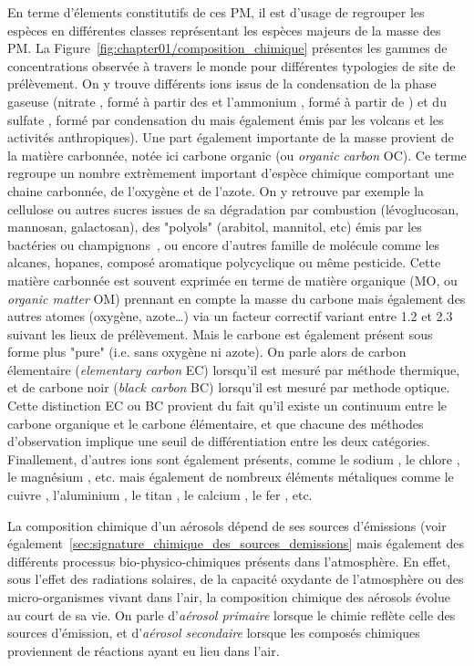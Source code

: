 En terme d'élements constitutifs de ces PM, il est d'usage de regrouper les espèces en
différentes classes représentant les espèces majeurs de la masse des PM. La
Figure~\ref{fig:chapter01/composition_chimique} présentes les gammes de concentrations
observée à travers le monde pour différentes typologies de site de prélèvement.
On y trouve différents ions issus de la condensation de la phase gaseuse (nitrate \NOt, formé à
partir des  et l'ammonium , formé à partir de ) et du sulfate
\SOq, formé par condensation du  mais également émis par les volcans et les
activités anthropiques).
Une part également importante de la masse provient de la matière carbonnée, notée ici
carbone organic (ou \textit{organic carbon} OC). Ce terme regroupe un nombre extrèmement
important d'espèce chimique comportant une chaine carbonnée, de l'oxygène et
de l'azote. On y retrouve par exemple la cellulose ou autres sucres issues de sa
dégradation par combustion (lévoglucosan, mannosan, galactosan), des "polyols" (arabitol,
mannitol, etc) émis par les bactéries ou champignons~\autocite{samakePolyols2019}, ou encore
d'autres famille de molécule comme les alcanes, hopanes, composé aromatique polycyclique
ou même pesticide. Cette matière carbonnée est souvent exprimée en terme de matière
organique (MO, ou \textit{organic matter} OM) prennant en compte la masse du carbone mais
également des autres atomes (oxygène, azote…) via un facteur correctif variant entre 1.2
et 2.3 suivant les lieux de prélèvement.
Mais le carbone est également présent sous forme plus "pure" (i.e. sans oxygène ni azote).
On parle alors de carbon élementaire (\textit{elementary carbon} EC) lorsqu'il est mesuré
par méthode thermique, et de carbone noir (\textit{black carbon} BC) lorsqu'il est mesuré
par methode optique. Cette distinction EC ou BC provient du fait qu'il existe un continuum
entre le carbone organique et le carbone élémentaire, et que chacune des méthodes
d'observation implique une seuil de différentiation entre les deux catégories.
Finallement, d'autres ions sont également présents, comme le sodium , le chlore
, le magnésium , etc. mais également de nombreux éléments métaliques
comme le cuivre , l'aluminium , le titan , le calcium , le fer
, etc.

La composition chimique d'un aérosols dépend de ses sources d'émissions (voir
également~\ref{sec:signature_chimique_des_sources_demissions} mais également des
différents processus bio-physico-chimiques présents dans l'atmosphère. En effet, sous
l'effet des radiations solaires, de la capacité oxydante de l'atmosphère ou des
micro-organismes vivant dans l'air, la composition chimique des aérosols évolue au court
de sa vie. On parle d'\textit{aérosol primaire} lorsque le chimie reflète celle des
sources d'émission, et d'\textit{aérosol secondaire} lorsque les composés chimiques
proviennent de réactions ayant eu lieu dans l'air.

